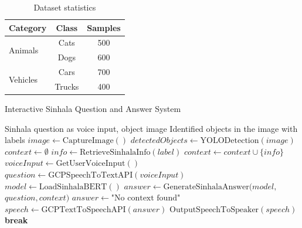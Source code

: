 \begin{table}[htbp]
    \centering
    \caption{Dataset statistics}
    \begin{tabular}{lcc}
        \toprule
        \textbf{Category}         & \textbf{Class} & \textbf{Samples} \\
        \midrule
        \multirow{2}{*}{Animals}  & Cats           & 500              \\
                                  & Dogs           & 600              \\
        \multirow{2}{*}{Vehicles} & Cars           & 700              \\
                                  & Trucks         & 400              \\
        \bottomrule
    \end{tabular}
    \label{tab:dataset}
\end{table}



\begin{algorithm}
    \caption{Interactive Sinhala Question and Answer System}
    \label{alg:interactive_sinhala_qas}
    \begin{algorithmic}[1]
        \Require Sinhala question as voice input, object image
        \Ensure Identified objects in the image with labels
        \Repeat
        \State $image \gets \text{CaptureImage}()$
        \State $detectedObjects \gets \text{YOLODetection}(image)$
        \State $context \gets \emptyset$ 
        \State $info \gets \text{RetrieveSinhalaInfo}(label)$
        \State $context \gets context \cup \{info\}$
        \EndIf
        \EndFor
        \State $voiceInput \gets \text{GetUserVoiceInput}()$
        \State $question \gets \text{GCPSpeechToTextAPI}(voiceInput)$
        \State $model \gets \text{LoadSinhalaBERT}()$
        \State $answer \gets \text{GenerateSinhalaAnswer}(model,$
            \Statex \hspace{2.8em} $question, context)$
        \Else
        \State $answer \gets \text{"No context found"}$
        \EndIf
        \State $speech \gets \text{GCPTextToSpeechAPI}(answer)$
        \State $\text{OutputSpeechToSpeaker}(speech)$
        \State \textbf{break}
        \EndIf

    \end{algorithmic}
\end{algorithm}


